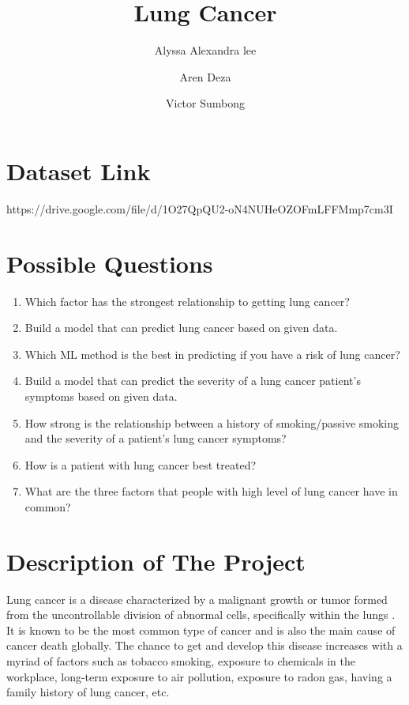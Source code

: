 \documentclass[runningheads]{llncs}
\begin{document}
\title{\textbf{\LARGE Lung Cancer}}

\author{Alyssa Alexandra lee\and Aren Deza\and Victor Sumbong}
\maketitle


\hfill\break %
\section {Dataset Link}
https://drive.google.com/file/d/1O27QpQU2-oN4NUHeOZOFmLFFMmp7cm3I

\section{Possible Questions}
\begin{enumerate}
\item Which factor has the strongest relationship to getting lung cancer?
\item Build a model that can predict lung cancer based on given data.
\item Which ML method is the best in predicting if you have a risk of lung cancer?
\item Build a model that can predict the severity of a lung cancer patient's symptoms based on given data.
\item How strong is the relationship between a history of smoking/passive smoking and the severity of a patient's lung cancer symptoms?
\item How is a patient with lung cancer best treated?
\item What are the three factors that people with high level of lung cancer have in common?
\end{enumerate}

\newpage

\section{Description of The Project}
Lung cancer is a disease characterized by a malignant growth or tumor formed from the uncontrollable division of abnormal cells, specifically within the lungs \cite{cancerResearchUK2019}. It is known to be the most common type of cancer and is also the main cause of cancer death globally. The chance to get and develop this disease increases with a myriad of factors such as tobacco smoking, exposure to chemicals in the workplace, long-term exposure to air pollution, exposure to radon gas, having a family history of lung cancer, etc.
\end{document}
